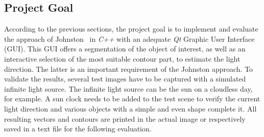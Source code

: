 \subsection{Project Goal}\label{sec:Project Goal}
According to the previous sections, the project goal is to implement and evaluate the approach of Johnston~\cite{Johnson} in \textit{C++} with an adequate \textit{Qt} Graphic User Interface (GUI). This GUI offers a segmentation of the object of interest, as well as an interactive selection of the most suitable contour part, to estimate the light direction. The latter is an important requirement of the Johnston approach. To validate the results, several test images have to be captured with a simulated infinite light source. The infinite light source can be the sun on a cloudless day, for example. A sun clock needs to be added to the test scene to verify the current light direction and various objects with a simple and even shape complete it. All resulting vectors and contours are printed in the actual image or respectively saved in a text file for the following evaluation.



\newpage


















